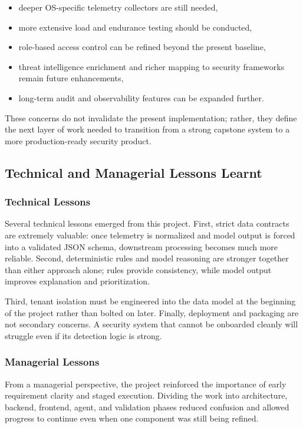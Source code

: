 \documentclass[12pt,a4paper]{article}
\begin{document}
\begin{itemize}
    \item deeper OS-specific telemetry collectors are still needed,
    \item more extensive load and endurance testing should be conducted,
    \item role-based access control can be refined beyond the present baseline,
    \item threat intelligence enrichment and richer mapping to security frameworks remain future enhancements,
    \item long-term audit and observability features can be expanded further.
\end{itemize}

These concerns do not invalidate the present implementation; rather, they define the next layer of work needed to transition from a strong capstone system to a more production-ready security product.

\subsection{Technical and Managerial Lessons Learnt}

\subsubsection{Technical Lessons}
Several technical lessons emerged from this project. First, strict data contracts are extremely valuable: once telemetry is normalized and model output is forced into a validated JSON schema, downstream processing becomes much more reliable. Second, deterministic rules and model reasoning are stronger together than either approach alone; rules provide consistency, while model output improves explanation and prioritization.

Third, tenant isolation must be engineered into the data model at the beginning of the project rather than bolted on later. Finally, deployment and packaging are not secondary concerns. A security system that cannot be onboarded cleanly will struggle even if its detection logic is strong.

\subsubsection{Managerial Lessons}
From a managerial perspective, the project reinforced the importance of early requirement clarity and staged execution. Dividing the work into architecture, backend, frontend, agent, and validation phases reduced confusion and allowed progress to continue even when one component was still being refined.
\end{document}
